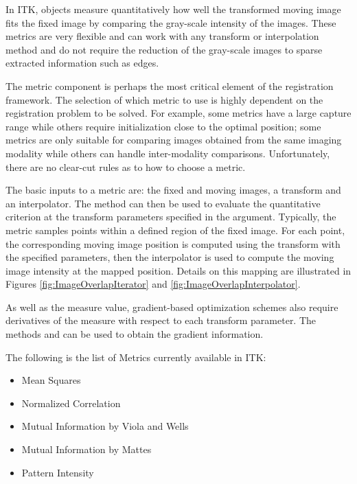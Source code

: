 %
%
%
%


In ITK,  objects measure quantitatively how well
the transformed moving image fits the fixed image by comparing the gray-scale
intensity of the images. These metrics are very flexible and can work with any
transform or interpolation method and do not require the reduction of the
gray-scale images to sparse extracted information such as edges.

The metric component is perhaps the most critical element of the registration
framework. The selection of which metric to use is highly dependent on the
registration problem to be solved. For example, some metrics have a large
capture range while others require initialization close to the optimal
position; some metrics are only suitable for comparing images obtained from the
same imaging modality while others can handle inter-modality comparisons.
Unfortunately, there are no clear-cut rules as to how to choose a metric.


The basic inputs to a metric are: the fixed and moving images, a transform and
an interpolator. The method  can then be used to evaluate the
quantitative criterion at the transform parameters specified in the argument.
Typically, the metric samples points within a defined region of the fixed
image.  For each point, the corresponding moving image position is computed
using the transform with the specified parameters, then the interpolator is
used to compute the moving image intensity at the mapped position. Details on
this mapping are illustrated in Figures \ref{fig:ImageOverlapIterator} and
\ref{fig:ImageOverlapInterpolator}. 

As well as the measure value, gradient-based optimization schemes also require
derivatives of the measure with respect to each transform parameter. The
methods  and  can be used
to obtain the gradient information.


The following is the list of Metrics currently available in ITK:
\begin{itemize}
\item Mean Squares
\item Normalized Correlation
\item Mutual Information by Viola and Wells
\item Mutual Information by Mattes
\item Pattern Intensity
\end{itemize}

